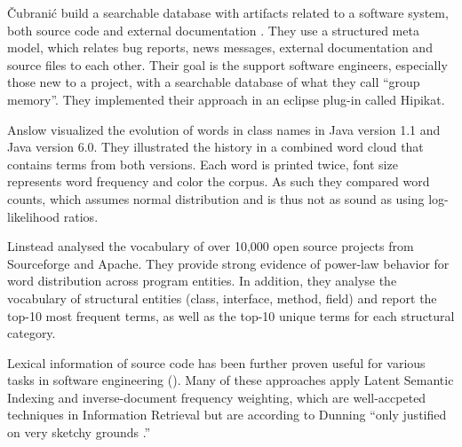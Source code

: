 \v{C}ubrani\'{c} \etal build a searchable database with artifacts related to a software system, both source code and external documentation \cite{Cubr03a}. They use a structured meta model, which relates bug reports, news messages, external documentation and source files to each other. Their goal is the support software engineers, especially those new to a project, with a searchable database of what they call ``group memory''. They implemented their approach in an eclipse plug-in called Hipikat.


Anslow \etal \cite{Anslow08OOPSLA} visualized the evolution of words in class names in Java version 1.1 and Java version 6.0. They illustrated the history in a combined word cloud that contains terms from both versions. Each word is printed twice, font size represents word frequency and color the corpus. As such they compared word counts, which assumes normal distribution and is thus not as sound as using log-likelihood ratios.
 
Linstead \etal \cite{Linstead09SUITE} analysed the vocabulary of over 10,000 open source projects from Sourceforge and Apache. They provide strong evidence of power-law behavior for word distribution across program entities. In addition, they analyse the vocabulary of structural entities (class, interface, method, field) and report the top-10 most frequent terms, as well as the top-10 unique terms for each structural category.

Lexical information of source code has been further proven useful for various tasks in software engineering (\eg \cite{Anto02a,Marc05a,Posh09a}). Many of these approaches apply Latent Semantic Indexing and inverse-document frequency weighting, which are well-accpeted techniques in Information Retrieval but are according to Dunning ``only justified on very sketchy grounds \cite{Dunning}.''

